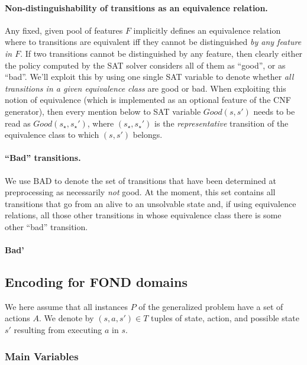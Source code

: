 \documentclass[a4paper]{article}
\newcommand{\badtx}{\ensuremath{\mathrm{BAD}}}
\begin{document}
\paragraph{Non-distinguishability of transitions as an equivalence relation.}
Any fixed, given pool of features $F$ implicitly defines an equivalence relation where to transitions are
equivalent iff they cannot be distinguished \emph{by any feature in $F$}.
If two transitions cannot be distinguished by any feature, then clearly either the policy computed by the SAT solver
considers all of them as ``good'', or as ``bad''.
We'll exploit this by using one single SAT variable to denote whether \emph{all transitions in a given equivalence
class} are good or bad. When exploiting this notion of equivalence (which is implemented as an optional feature of
the CNF generator), then every mention below to SAT variable $Good(s, s')$ needs to be read as $Good(s_{\star}, s_{\star}')$,
where $(s_{\star}, s_{\star}')$ is the \emph{representative} transition of the equivalence class to which $(s, s')$ belongs.

\paragraph{``Bad'' transitions.}
We use \badtx{} to denote the set of transitions that have been determined at preprocessing as necessarily
\emph{not} good.
At the moment, this set contains all transitions that go from an alive to an unsolvable state and, if using
equivalence relations, all those other transitions in whose equivalence class there is some other ``bad'' transition.

\paragraph{Bad'}

\newpage

\subsection{Encoding for FOND domains}

We here assume that all instances $P$ of the generalized problem have a set of actions $A$.
We denote by $(s, a, s') \in T$ tuples of state, action, and possible state $s'$ resulting from executing $a$ in $s$.

\subsubsection{Main Variables}
\end{document}
